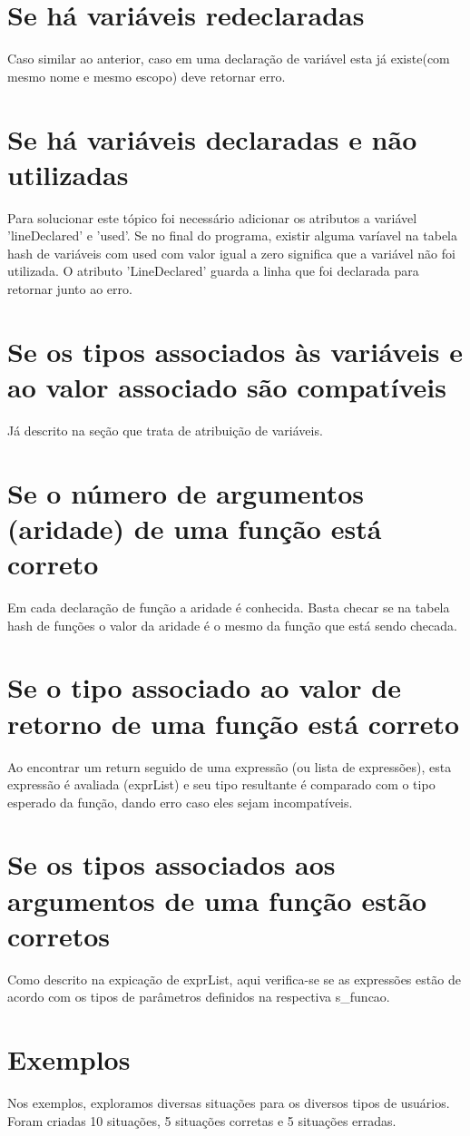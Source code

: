\documentclass[a4paper,10pt]{article}
\begin{document}
\section{Se há variáveis redeclaradas}
Caso similar ao anterior, caso em uma declaração de variável esta já existe(com mesmo nome e mesmo escopo) deve retornar erro.
\section{Se há variáveis declaradas e não utilizadas}
Para solucionar este tópico foi necessário adicionar os atributos a variável 'lineDeclared' e 'used'. Se no final do programa, existir alguma varíavel na tabela hash de variáveis
com used com valor igual a zero significa que a variável não foi utilizada. O atributo 'LineDeclared' guarda a linha que foi declarada para retornar junto ao erro.

\section{Se os tipos associados às variáveis e ao valor associado são compatíveis}
Já descrito na se\c cão que trata de atribui\c cão de variáveis.

\section{Se o número de argumentos (aridade) de uma função está correto}
Em cada declaração de função a aridade é conhecida. Basta checar se na tabela hash de funções o valor da aridade é o mesmo da função que está sendo checada.

\section{Se o tipo associado ao valor de retorno de uma função está correto}
Ao encontrar um return seguido de uma expressão (ou lista de expressões), esta expressão é avaliada (exprList) e seu tipo resultante é comparado com o tipo
esperado da fun\c cão, dando erro caso eles sejam incompatíveis.

\section{Se os tipos associados aos argumentos de uma função estão corretos}
Como descrito na expica\c cão de exprList, aqui verifica-se se as expressões estão de acordo com os tipos de parâmetros definidos na respectiva s\_{}funcao.


\section{Exemplos}
Nos exemplos, exploramos diversas situações para os diversos tipos de usuários. Foram criadas 10 situações, 5 situações corretas e 5 
situações erradas.
\end{document}
